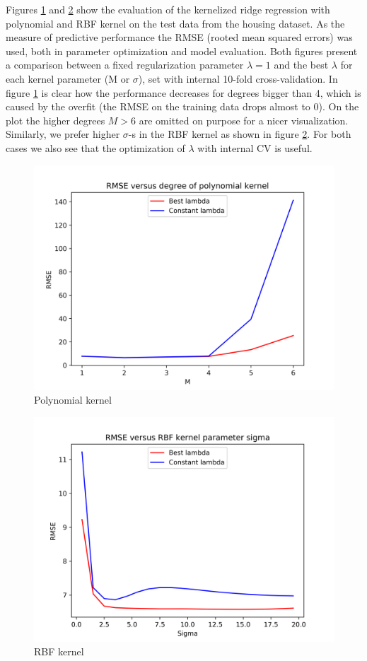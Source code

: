 \documentclass[twocolumn]{article}
\begin{document}
Figures \ref{fig:house_pol} and \ref{fig:house_rbf} show the evaluation of the kernelized ridge regression with polynomial and RBF kernel on the test data from the housing dataset. As the measure of predictive performance the RMSE (rooted mean squared errors) was used, both in parameter optimization and model evaluation. Both figures present a comparison between a fixed regularization parameter $\lambda  = 1$ and the best $\lambda$ for each kernel parameter (M or $\sigma$), set with internal 10-fold cross-validation. In figure \ref{fig:house_pol} is clear how the performance decreases for degrees bigger than 4, which is caused by the overfit (the RMSE on the training data drops almost to 0). On the plot the higher degrees $M > 6$ are omitted on purpose for a nicer visualization. Similarly, we prefer higher $\sigma$-s in the RBF kernel as shown in figure \ref{fig:house_rbf}. For both cases we also see that the optimization of $\lambda$ with internal CV is useful.

\begin{figure}[ht]
    \centering
    \includegraphics[width=.4\textwidth]{housing_pol.png}
    \caption{Polynomial kernel}
    \label{fig:house_pol}
\end{figure}

\begin{figure}[ht]
    \centering
    \includegraphics[width=.4\textwidth]{housing_rbf.png}
    \caption{RBF kernel}
    \label{fig:house_rbf}
\end{figure}
\end{document}
